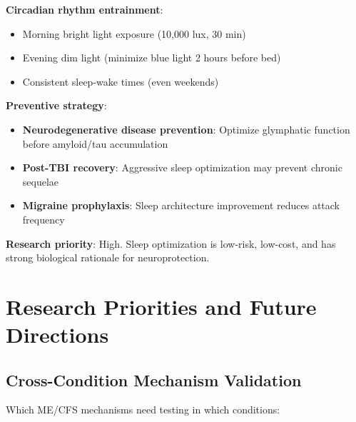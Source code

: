 \textbf{Circadian rhythm entrainment}:
\begin{itemize}
    \item Morning bright light exposure (10,000 lux, 30 min)
    \item Evening dim light (minimize blue light 2 hours before bed)
    \item Consistent sleep-wake times (even weekends)
\end{itemize}

\textbf{Preventive strategy}:
\begin{itemize}
    \item \textbf{Neurodegenerative disease prevention}: Optimize glymphatic function before amyloid/tau accumulation
    \item \textbf{Post-TBI recovery}: Aggressive sleep optimization may prevent chronic sequelae
    \item \textbf{Migraine prophylaxis}: Sleep architecture improvement reduces attack frequency
\end{itemize}

\textbf{Research priority}: High. Sleep optimization is low-risk, low-cost, and has strong biological rationale for neuroprotection.

\section{Research Priorities and Future Directions}
\label{sec:translational-research-priorities}

\subsection{Cross-Condition Mechanism Validation}

Which ME/CFS mechanisms need testing in which conditions:

